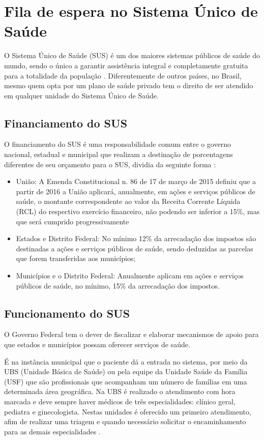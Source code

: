 \section{Fila de espera no Sistema Único de Saúde}
    O Sistema Único de Saúde (SUS) é um dos maiores sistemas públicos de saúde do mundo, sendo o único a
    garantir assistência integral e completamente gratuita para a totalidade da população . Diferentemente de outros países, no Brasil, mesmo quem opta por um plano de saúde privado tem o direito de ser atendido em qualquer unidade do Sistema Único de Saúde.
   
   \subsection{Financiamento do SUS}
   
     O financiamento do SUS é uma responsabilidade comum entre o governo nacional, estadual e municipal que realizam a destinação de porcentagens diferentes de seu orçamento para o SUS, dividia da seguinte forma :
    \begin{itemize}
        \item União: A Emenda Constitucional n. 86 de 17 de março de 2015 definiu que a partir de 2016 a União aplicará, anualmente, em ações e serviços públicos de saúde, o montante correspondente ao valor da Receita Corrente Líquida (RCL) do respectivo exercício financeiro, não podendo ser inferior a 15\%, mas que será cumprido progressivamente
        \item  Estados e Distrito Federal: No mínimo 12\% da arrecadação dos impostos são destinadas a ações e serviços públicos de saúde, sendo deduzidas as parcelas que forem transferidas aos municípios;
        \item Municípios e o Distrito Federal: Anualmente aplicam em ações e serviços públicos de saúde, no mínimo, 15\% da arrecadação dos impostos.
    \end{itemize} 

   
   	\subsection{Funcionamento do SUS}
   	
    O Governo Federal tem o dever de fiscalizar e elaborar mecanismos de apoio para que  estados e municípios possam oferecer serviços de saúde.

   É na instância municipal que o paciente dá a entrada no sistema, por meio da UBS (Unidade Básica de Saúde) ou pela equipe da Unidade Saúde da Família (USF) que são profissionais que acompanham um número de famílias em uma determinada área geográfica. Na UBS é realizado o atendimento com hora marcada e deve sempre haver médicos de três especialidades: clínico geral, pediatra e ginecologista. Nestas unidades é oferecido um primeiro atendimento, afim de realizar uma triagem e quando necessário solicitar o encaminhamento para as demais especialidades .
   
